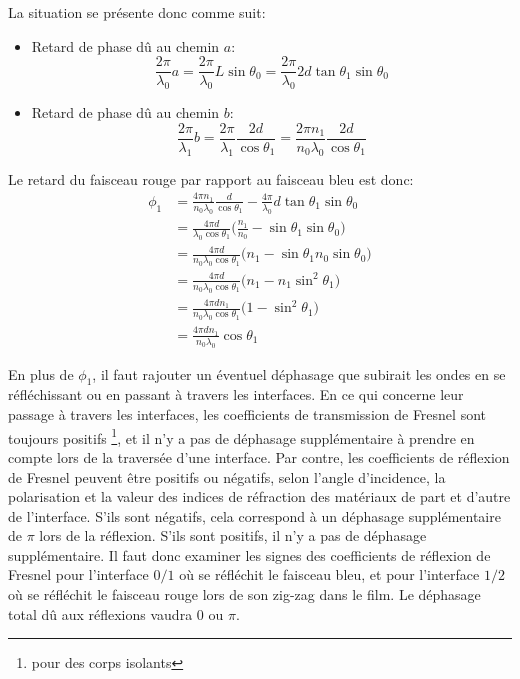 La situation se présente donc comme suit:
\begin{itemize}
    \item Retard de phase dû au chemin $a$:
    $$ \frac{2\pi}{\lambda_0}a=\frac{2\pi}{\lambda_0}L\sin \theta_0=\frac{2\pi}{\lambda_0}2d \tan \theta_1 \sin \theta_0$$
    \item Retard de phase dû au chemin $b$:
    $$\frac{2\pi}{\lambda_1}b=\frac{2\pi}{\lambda_1}\frac{2d}{\cos \theta_1}=\frac{2\pi n_1}{n_0\lambda_0}\frac{2d}{\cos \theta_1}$$
\end{itemize}
Le retard du faisceau rouge par rapport au faisceau bleu est donc:
\begin{align*}
\phi_1 & = \frac{4\pi n_1}{n_0\lambda_0}\frac{d}{\cos \theta_1}-\frac{4\pi}{\lambda_0}d \tan \theta_1 \sin \theta_0 \\
& = \frac{4\pi d}{\lambda_0 \cos \theta_1}\Big (\frac{n_1}{n_0}-\sin \theta_1 \sin \theta_0\Big ) \\
& = \frac{4\pi d}{n_0\lambda_0 \cos \theta_1}\big (n_1-\sin \theta_1 n_0\sin \theta_0\big )\\
& = \frac{4\pi d}{n_0\lambda_0 \cos \theta_1}\big (n_1- n_1\sin^2 \theta_1\big )\\
& = \frac{4\pi dn_1}{n_0\lambda_0 \cos \theta_1}\big (1- \sin^2 \theta_1\big )\\
& = \frac{4\pi dn_1}{n_0\lambda_0 }\cos \theta_1
\end{align*}

En plus de $\phi_1$, il faut rajouter un éventuel déphasage que subirait les ondes en se réfléchissant ou en passant à travers les interfaces. En ce qui concerne leur passage à travers les interfaces, les coefficients de transmission de Fresnel sont toujours positifs \footnote{pour des corps isolants}, et il n'y a pas de déphasage supplémentaire à prendre en compte lors de la traversée d'une interface. Par contre, les coefficients de réflexion de Fresnel peuvent être positifs ou négatifs, selon l'angle d'incidence, la polarisation et la valeur des indices de réfraction des matériaux de part et d'autre de l'interface. S'ils sont négatifs, cela correspond à un déphasage supplémentaire de $\pi$ lors de la réflexion. S'ils sont positifs, il n'y a pas de déphasage supplémentaire. Il faut donc examiner les signes des coefficients de réflexion de Fresnel pour l'interface $0/1$ où se réfléchit le faisceau bleu, et pour l'interface $1/2$ où se réfléchit le faisceau rouge lors de son zig-zag dans le film. Le déphasage total dû aux réflexions vaudra $0$ ou $\pi$.


